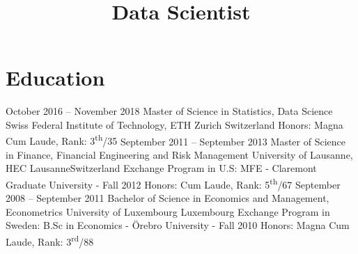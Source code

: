 \documentclass[11pt,a4paper,sans]{moderncv}
\title{Data Scientist}
\begin{document}
\makecvtitle %
\vspace*{-10mm}

\section{\LARGE{Education}}
\vspace{2mm}
\cventry
	{October 2016 -- November 2018}
	{Master of Science in Statistics, Data Science}
	{Swiss Federal Institute of Technology, ETH Zurich}
	{Switzerland}{}
	{Honors: Magna Cum Laude, Rank: 3\textsuperscript{th}/35} %
\vspace{2mm}
\cventry
	{September 2011 -- September 2013}
	{Master of Science in Finance, Financial Engineering and Risk Management}
	{University of Lausanne, HEC Lausanne}{Switzerland}{}
	{Exchange Program in U.S: MFE - Claremont Graduate University - Fall 2012
	\newline Honors: Cum Laude, Rank: {5\textsuperscript{th}/67}} %
\vspace{2mm}
\cventry
	{September 2008 -- September 2011}
	{Bachelor of Science in Economics and Management, Econometrics}
	{University of Luxembourg}
	{Luxembourg}{}
	{Exchange Program in Sweden: B.Sc in Economics - Örebro University - Fall 2010
	\newline  Honors: Magna Cum Laude, Rank: {3\textsuperscript{rd}/88}}  %
\end{document}
